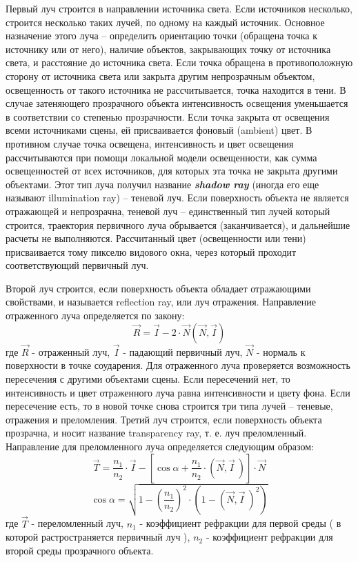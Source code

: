 \documentclass[12pt, a4paper]{article}
\begin{document}
Первый луч строится в направлении источника света. Если источников несколько, строится несколько таких лучей, по одному на каждый источник. Основное назначение этого луча – определить ориентацию точки (обращена точка к источнику или от него), наличие объектов, закрывающих точку от источника света, и расстояние до источника света. Если точка обращена в противоположную сторону от источника света или закрыта другим непрозрачным объектом, освещенность от такого источника не рассчитывается, точка находится в тени. В случае затеняющего прозрачного объекта интенсивность освещения уменьшается в соответствии со степенью прозрачности. Если точка закрыта от освещения всеми источниками сцены, ей присваивается фоновый (ambient) цвет. В противном случае точка освещена, интенсивность и цвет освещения рассчитываются при помощи локальной модели освещенности, как сумма освещенностей от всех источников, для которых эта точка не закрыта другими объектами. Этот тип луча получил название  \textit{\textbf{shadow ray}} (иногда его еще называют illumination ray) – теневой луч. Если поверхность объекта не является отражающей и непрозрачна, теневой луч – единственный тип лучей который строится, траектория первичного луча обрывается (заканчивается), и дальнейшие расчеты не выполняются. Рассчитанный цвет (освещенности или тени) присваивается тому пикселю видового окна, через который проходит соответствующий первичный луч.
   \par
   Второй луч строится, если поверхность объекта обладает отражающими свойствами, и называется  reflection ray, или луч отражения. Направление отраженного луча определяется по закону:
$$
	\vec{R} = \vec{I} - 2 \cdot \vec{N} (\vec{N} , \vec{I})
$$
где $\vec{R}$ - отраженный луч, $\vec{I}$ - падающий первичный луч, $\vec{N}$ - нормаль к поверхности в точке соударения.
Для отраженного луча проверяется возможность пересечения с другими объектами сцены. Если пересечений нет, то интенсивность и цвет отраженного луча равна интенсивности и цвету фона. Если пересечение есть, то в новой точке снова строится три типа лучей – теневые, отражения и преломления.
Третий луч строится, если поверхность объекта прозрачна, и носит название transparency ray, т. е. луч преломленный. Направление для преломленного луча определяется следующим образом:
$$
 \vec{T} = \frac{n_1}{n_2} \cdot \vec{I} - \left[ \cos \alpha + \frac{n_1}{n_2} \cdot \left(\vec{N},\vec{I} \ \right) \right] \cdot \vec{N}
$$
$$
\cos \alpha = \sqrt{1 - \left( \frac{n_1}{n_2} \right) ^2 \cdot \left(1-\left(\vec{N},\vec{I}\ \right)^2\right)}
$$
где $\vec{T}$ - переломленный луч, $n_1$ - коэффициент рефракции для первой среды ( в которой растространяется первичный луч ), $n_2$ - коэффициент рефракции для второй среды прозрачного объекта.
\end{document}
